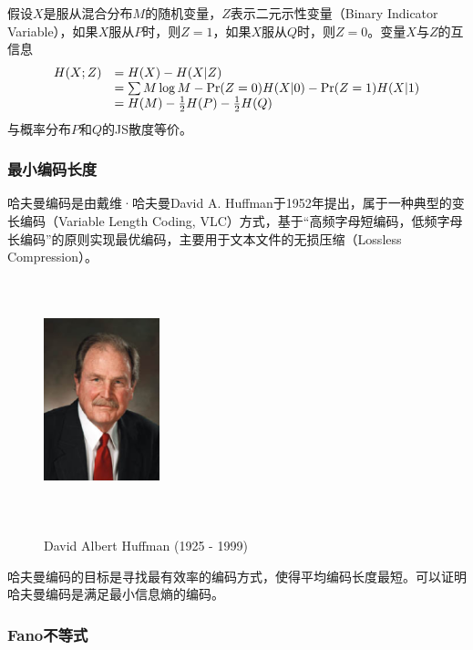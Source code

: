 假设$X$是服从混合分布$M$的随机变量，$Z$表示二元示性变量（Binary Indicator Variable），如果$X$服从$P$时，则$Z=1$，如果$X$服从$Q$时，则$Z=0$。变量$X$与$Z$的互信息
\begin{equation}
\begin{array}{ll}
  H(X;Z) & = H(X) - H(X|Z)\\
   & = \sum M\log M - \operatorname{\mathrm{Pr}}(Z = 0) H(X|0) - \operatorname{\mathrm{Pr}}(Z = 1)H(X|1)\\
   & = H(M) - \frac{1}{2}H(P) - \frac{1}{2}H(Q)
\end{array}
\end{equation}
与概率分布$P$和$Q$的JS散度等价。

\subsubsection{最小编码长度}
哈夫曼编码是由戴维·哈夫曼David A. Huffman于1952年提出，属于一种典型的变长编码（Variable Length Coding, VLC）方式，基于“高频字母短编码，低频字母长编码”的原则实现最优编码，主要用于文本文件的无损压缩（Lossless Compression）。
\begin{figure}[t]
  \centering
  \includegraphics[width=0.3\textwidth, height = 7cm]{figures/scientists/DavidHuffman.eps}\\
  \caption{David Albert Huffman (1925 - 1999)}\label{fig:DavidHuffman}
\end{figure}

哈夫曼编码的目标是寻找最有效率的编码方式，使得平均编码长度最短。可以证明哈夫曼编码是满足最小信息熵的编码。
\subsubsection{Fano不等式}
